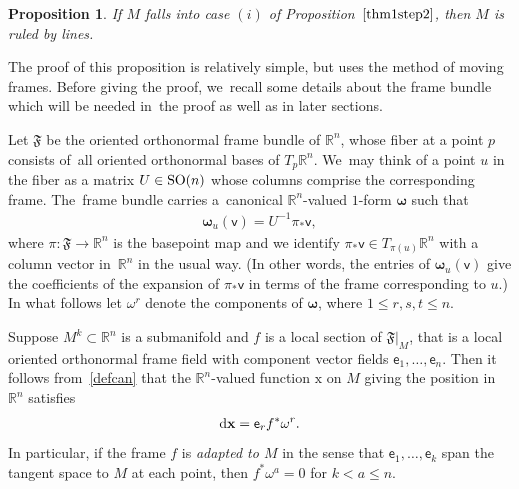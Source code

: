 \documentclass[pdftex]{sigma}
\def\R{\mathbb{R}}
\def\ve{\mathsf{e}}
\def\vv{\mathsf{v}}
\def\vx{\boldsymbol{\mathrm{x}}}
\def\vomega{\boldsymbol{\omega}}
\def\F{\mathfrak{F}}
\def\w{\omega}
\newtheorem{Proposition}[Theorem]{Proposition}
\numberwithin{equation}{section}
\begin{document}
\begin{Proposition} \label{ruledprop}
If $M$ falls into case $(i)$ of Proposition~$\ref{thm1step2}$, then $M$ is ruled by lines.
\end{Proposition}
The proof of this proposition is relatively simple, but uses the method of moving frames. Before giving the proof, we~recall some details about the frame bundle which will be needed in~the proof as well as in later sections.

Let $\F$ be the oriented orthonormal frame bundle of $\R^n$, whose fiber at a point $p$ consists of~all oriented orthonormal bases of $T_p \R^n$. We~may think of a point $u$ in the fiber as a matrix $U \in {\rm SO}(n)$ whose columns comprise the corresponding frame. The~frame bundle carries a~canonical $\R^n$-valued $1$-form $\vomega$ such that
\begin{gather} \label{defcan}
\vomega_u(\vv) = U^{-1} \pi_* \vv,
\end{gather}
where $\pi\colon\F \to \R^n$ is the basepoint map and we identify $\pi_*\vv \in T_{\pi(u)} \R^n$ with a column vector in~$\R^n$ in the usual way. (In other words, the entries of $\vomega_u(\vv)$ give the coefficients of the expansion of $\pi_* \vv$ in terms of the frame corresponding to $u$.) In what follows let $\w^r$ denote the components of $\vomega$, where $1 \le r,s,t \le n$.

Suppose $M^k \subset \R^n$ is a submanifold and $f$ is a local section of $\F\vert_M$, that is a local oriented orthonormal frame field with component vector fields $\ve_1, \dots, \ve_n$. Then it follows from~\eqref{defcan} that the $\R^n$-valued function $\vx$ on $M$ giving the position in $\R^n$ satisfies
\begin{gather} \label{deex}
{\rm d}\vx = \ve_r f^* \w^r.
\end{gather}
In particular, if the frame $f$ is \emph{adapted to $M$} in the sense that $\ve_1, \dots, \ve_k$ span the tangent space to $M$ at each point, then $f^* \w^a=0$ for $k < a\le n$.
\end{document}
